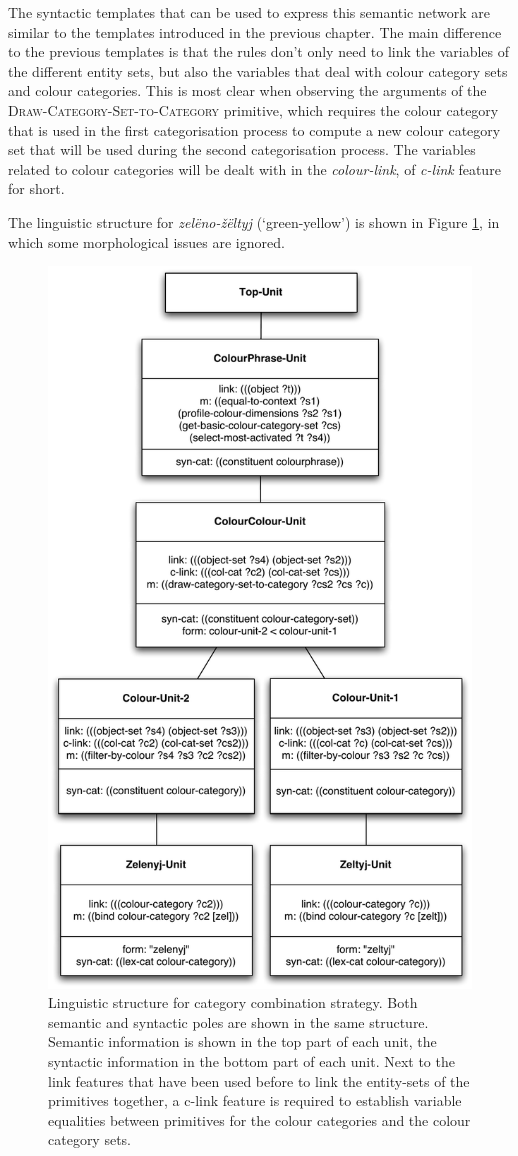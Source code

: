 The syntactic templates that can be used to express this semantic
network are similar to the templates introduced in the previous
chapter. The main difference to the previous templates is that the
rules don't only need to link the variables of the different entity
sets, but also the variables that deal with colour category sets and
colour categories. This is most clear when observing the arguments of
the \textsc{Draw-Category-Set-to-Category} primitive, which requires
the colour category that is used in the first categorisation process
to compute a new colour category set that will be used during the
second categorisation process. The variables related to colour
categories will be dealt with in the \emph{colour-link}, of
\emph{c-link} feature for short.

The linguistic structure for \textit{zel\"eno-\v z\"eltyj} (`green-yellow')
is shown in Figure \ref{f:ccs-linguistic-structure}, in which some
morphological issues are ignored.

\begin{figure}[htbp]
  \centering
  \includegraphics[width=.70\textwidth]{./category-combination/figures/linguistic-structure.pdf}
  \caption[Linguistic structure for category combination
  strategy]{Linguistic structure for category combination
    strategy. Both semantic and syntactic poles are shown in the same
    structure. Semantic information is shown in the top part of each
    unit, the syntactic information in the bottom part of each
    unit. Next to the link features that have been used before to link
    the entity-sets of the primitives together, a c-link feature is
    required to establish variable equalities between primitives for
    the colour categories and the colour category sets.}
  \label{f:ccs-linguistic-structure}
\end{figure}

